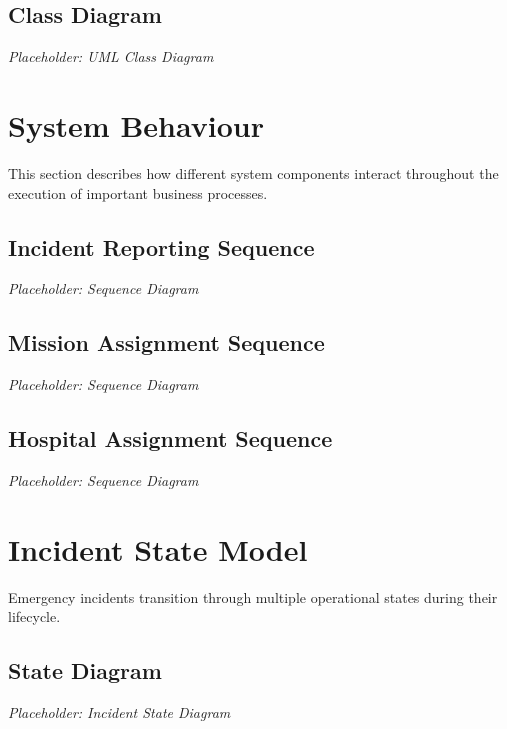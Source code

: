 \subsection{Class Diagram}

\textit{Placeholder: UML Class Diagram}


\section{System Behaviour}

This section describes how different system components interact throughout the execution of important business processes.

\subsection{Incident Reporting Sequence}

\textit{Placeholder: Sequence Diagram}

\subsection{Mission Assignment Sequence}

\textit{Placeholder: Sequence Diagram}

\subsection{Hospital Assignment Sequence}

\textit{Placeholder: Sequence Diagram}


\section{Incident State Model}

Emergency incidents transition through multiple operational states during their lifecycle.

\subsection{State Diagram}

\textit{Placeholder: Incident State Diagram}



